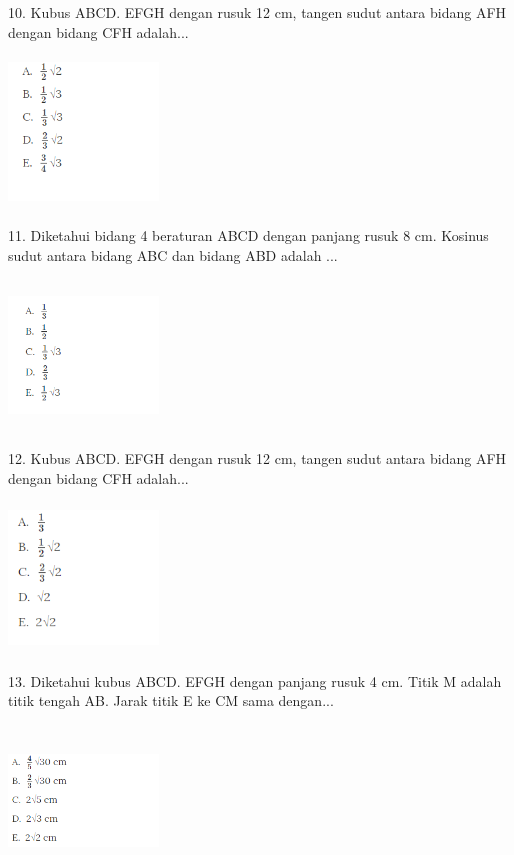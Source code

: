 \documentclass[11pt,fleqn]{book} %
\begin{document}
10. Kubus ABCD. EFGH dengan rusuk 12 cm, tangen sudut antara bidang AFH dengan bidang CFH adalah...

\includegraphics[width = 4cm, height= 4cm]{Pictures/gi38.png}

11. Diketahui bidang 4 beraturan ABCD dengan panjang rusuk 8 cm. Kosinus sudut antara bidang ABC dan bidang ABD adalah ...

\includegraphics[width = 4cm, height= 4cm]{Pictures/gi39.png}

12. Kubus ABCD. EFGH dengan rusuk 12 cm, tangen sudut antara bidang AFH dengan bidang CFH adalah...

\includegraphics[width = 4cm, height= 4cm]{Pictures/gi40.png}

13. Diketahui kubus ABCD. EFGH dengan panjang rusuk 4 cm. Titik M adalah titik tengah AB. Jarak titik E ke CM sama dengan...


\includegraphics[width = 4cm, height= 4cm]{Pictures/gi41.png}
\end{document}
